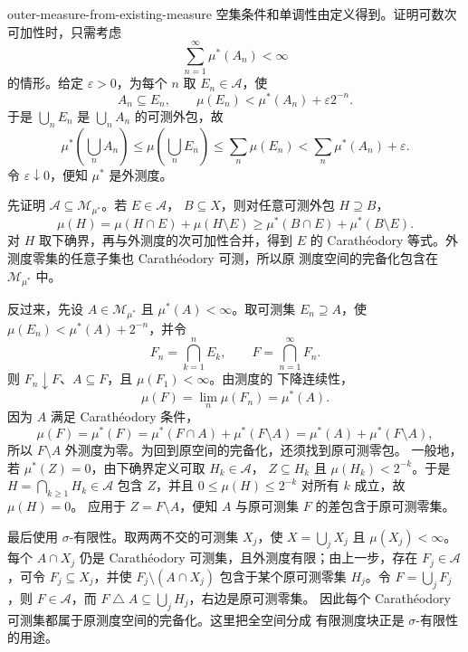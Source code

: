 \begin{solution}{outer-measure-from-existing-measure}
空集条件和单调性由定义得到。证明可数次可加性时，只需考虑
\[
 \sum_{n=1}^{\infty}\mu^*(A_n)<\infty
\]
的情形。给定 $\varepsilon>0$，为每个 $n$ 取
$E_n\in\mathcal A$，使
\[
 A_n\subseteq E_n,
 \qquad
 \mu(E_n)<\mu^*(A_n)+\varepsilon2^{-n}.
\]
于是 $\bigcup_nE_n$ 是 $\bigcup_nA_n$ 的可测外包，故
\[
 \mu^*\left(\bigcup_nA_n\right)
 \le \mu\left(\bigcup_nE_n\right)
 \le \sum_n\mu(E_n)
 <\sum_n\mu^*(A_n)+\varepsilon.
\]
令 $\varepsilon\downarrow0$，便知 $\mu^*$ 是外测度。

先证明 $\mathcal A\subseteq\mathcal M_{\mu^*}$。若 $E\in\mathcal A$，
$B\subseteq X$，则对任意可测外包 $H\supseteq B$，
\[
 \mu(H)=\mu(H\cap E)+\mu(H\setminus E)
 \ge \mu^*(B\cap E)+\mu^*(B\setminus E).
\]
对 $H$ 取下确界，再与外测度的次可加性合并，得到 $E$ 的
Carathéodory 等式。外测度零集的任意子集也 Carathéodory 可测，所以原
测度空间的完备化包含在 $\mathcal M_{\mu^*}$ 中。

反过来，先设 $A\in\mathcal M_{\mu^*}$ 且 $\mu^*(A)<\infty$。取可测集
$E_n\supseteq A$，使
$\mu(E_n)<\mu^*(A)+2^{-n}$，并令
\[
 F_n=\bigcap_{k=1}^nE_k,
 \qquad F=\bigcap_{n=1}^{\infty}F_n.
\]
则 $F_n\downarrow F$、$A\subseteq F$，且 $\mu(F_1)<\infty$。由测度的
下降连续性，
\[
 \mu(F)=\lim_n\mu(F_n)=\mu^*(A).
\]
因为 $A$ 满足 Carathéodory 条件，
\[
 \mu(F)=\mu^*(F)
 =\mu^*(F\cap A)+\mu^*(F\setminus A)
 =\mu^*(A)+\mu^*(F\setminus A),
\]
所以 $F\setminus A$ 外测度为零。为回到原空间的完备化，还须找到原可测零包。
一般地，若 $\mu^*(Z)=0$，由下确界定义可取 $H_k\in\mathcal A$，
$Z\subseteq H_k$ 且 $\mu(H_k)<2^{-k}$。于是
$H=\bigcap_{k\ge1}H_k\in\mathcal A$ 包含 $Z$，并且
$0\le\mu(H)\le2^{-k}$ 对所有 $k$ 成立，故 $\mu(H)=0$。
应用于 $Z=F\setminus A$，便知 $A$ 与原可测集 $F$ 的差包含于原可测零集。

最后使用 $\sigma$-有限性。取两两不交的可测集 $X_j$，使
$X=\bigcup_jX_j$ 且 $\mu(X_j)<\infty$。每个 $A\cap X_j$ 仍是
Carathéodory 可测集，且外测度有限；由上一步，存在
$F_j\in\mathcal A$，可令 $F_j\subseteq X_j$，并使
$F_j\setminus(A\cap X_j)$ 包含于某个原可测零集 $H_j$。令 $F=\bigcup_jF_j$，则
$F\in\mathcal A$，而 $F\mathbin\triangle A\subseteq\bigcup_jH_j$，右边是原可测零集。
因此每个 Carathéodory 可测集都属于原测度空间的完备化。这里把全空间分成
有限测度块正是 $\sigma$-有限性的用途。
\end{solution}

